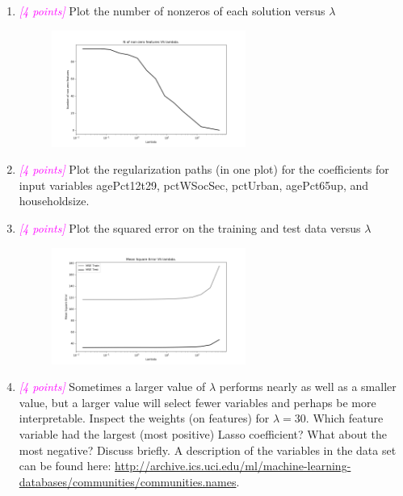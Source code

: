 \documentclass{article}
\newcommand{\1}{\mathbf{1}}
\newcommand{\points}[1]{\small\textcolor{magenta}{\emph{[#1 points]}} \normalsize}
\begin{document}
\begin{enumerate}
    \item \points{4} Plot the number of nonzeros of each solution versus $\lambda$ \\
    \begin{figure}[h!]
        \centering
        \includegraphics[width=0.6\textwidth]{HW2/HW2_plots/A5ZerosVSLambdas.png}
    \end{figure}
    
    \newpage
    \item \points{4} Plot the regularization paths (in one plot) for the coefficients for input variables agePct12t29, pctWSocSec, pctUrban, agePct65up, and householdsize. \\ 
    
    \item \points{4} Plot the squared error on the training and test data versus $\lambda$ \\
    \begin{figure}[h!]
        \centering
        \includegraphics[width=0.6\textwidth]{HW2/HW2_plots/MSEA5.png}
    \end{figure}
    
    \newpage
    \item \points{4} Sometimes a larger value of $\lambda$ performs nearly as well as a smaller value, but a larger value will select fewer variables and perhaps be more interpretable. Inspect the weights (on features) for $\lambda = 30$. Which feature variable had the largest (most positive) Lasso coefficient? What about the most negative? Discuss briefly. A description of the variables in the data set can be found here: \url{http://archive.ics.uci.edu/ml/machine-learning-databases/communities/communities.names}. \\
    

\end{enumerate}
\end{document}
